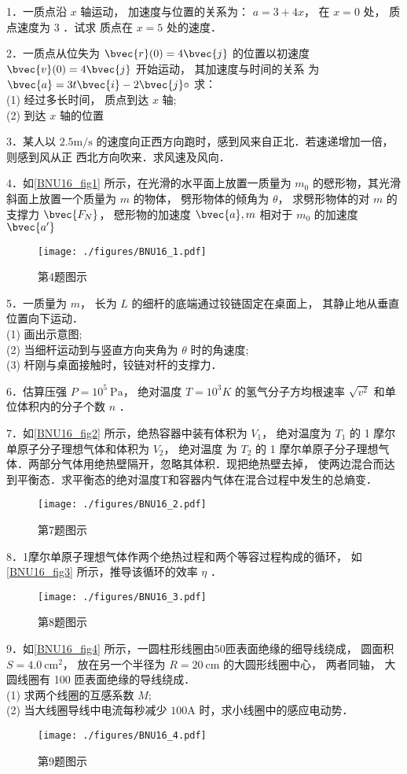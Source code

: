 
1．一质点沿 $x$ 轴运动， 加速度与位置的关系为： $a=3+4 x$， 在 $x=0$ 处， 质点速度为 3 ．试求 质点在 $x=5$ 处的速度．

2．一质点从位失为 $\bvec{r}(0)=4 \bvec{j}$ 的位置以初速度 $\bvec{v}(0)=4 \bvec{j}$ 开始运动， 其加速度与时间的关系 为 $\bvec{a}=3 t \bvec{i}-2 \bvec{j} \circ$ 求：\\
(1) 经过多长时间， 质点到达 $x$ 轴;\\
(2) 到达 $x$ 轴的位置

3．某人以 $2.5 \mathrm{m / s}$ 的速度向正西方向跑时，感到风来自正北．若速递增加一倍， 则感到风从正 西北方向吹来．求风速及风向．

4．如\autoref{BNU16_fig1} 所示，在光滑的水平面上放置一质量为 $m_{0}$ 的憵形物，其光滑斜面上放置一个质量为 $m$ 的物体， 劈形物体的倾角为 $\theta$， 求劈形物体的对 $m$ 的支撑力 $\bvec{F_{N}}$， 憵形物的加速度 $\bvec{a}, m$ 相对于 $m_{0}$ 的加速度 $\bvec{a^{\prime}}$
\begin{figure}[ht]
\centering
\texttt{[image: ./figures/BNU16\_1.pdf]}
\caption{第4题图示} \label{BNU16_fig1}
\end{figure}
5．一质量为 $m$， 长为 $L$ 的细杆的底端通过铰链固定在桌面上， 其静止地从垂直位置向下运动．\\
(1) 画出示意图;\\
(2) 当细杆运动到与竖直方向夹角为 $\theta$ 时的角速度;\\
(3) 杆刚与桌面接触时，铰链对杆的支撑力．

6．估算压强 $P=10^{5} \mathrm{~Pa}$， 绝对温度 $T=10^{3} K$ 的氢气分子方均根速率 $\sqrt{v^{2}}$ 和单位体积内的分子个数 $n$ ．

7．如\autoref{BNU16_fig2} 所示，绝热容器中装有体积为 $V_{1}$， 绝对温度为 $T_{1}$ 的 1 摩尔单原子分子理想气体和体积为 $V_{2}$， 绝对温度 为 $T_{2}$ 的 1 摩尔单原子分子理想气体．两部分气体用绝热壁隔开，忽略其体积．现把绝热壁去掉， 使两边混合而达到平衡态．求平衡态的绝对温度T和容器内气体在混合过程中发生的总熵变．
\begin{figure}[ht]
\centering
\texttt{[image: ./figures/BNU16\_2.pdf]}
\caption{第7题图示} \label{BNU16_fig2}
\end{figure}
8．1摩尔单原子理想气体作两个绝热过程和两个等容过程构成的循环， 如\autoref{BNU16_fig3} 所示，推导该循环的效率 $\eta$ ．
\begin{figure}[ht]
\centering
\texttt{[image: ./figures/BNU16\_3.pdf]}
\caption{第8题图示} \label{BNU16_fig3}
\end{figure}
9．如\autoref{BNU16_fig4} 所示，一圆柱形线圈由50匝表面绝缘的细导线绕成， 圆面积 $S=4.0 \mathrm{~cm}^{2}$， 放在另一个半径为 $R=20 \mathrm{~cm}$ 的大圆形线圈中心， 两者同轴， 大圆线圈有 100 匝表面绝缘的导线绕成．\\
(1) 求两个线圈的互感系数 $M$;\\
(2) 当大线圈导线中电流每秒减少 $100\mathrm{A}$ 时，求小线圈中的感应电动势．
\begin{figure}[ht]
\centering
\texttt{[image: ./figures/BNU16\_4.pdf]}
\caption{第9题图示} \label{BNU16_fig4}
\end{figure}

